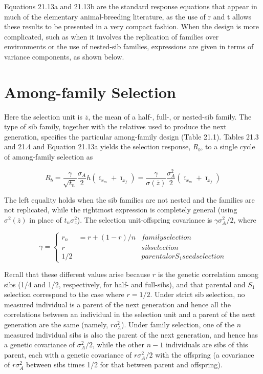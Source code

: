 \documentclass{article}
\begin{document}
Equations 21.13a and 21.13b are the standard response equations that appear in much of the elementary animal-breeding literature, as the use of r and t allows these results to be presented in a very compact fashion. When the design is more complicated, such as when it involves the replication of families over environments or the use of nested-sib families, expressions are given in terms of variance components, as shown below.

\section{Among-family Selection}
Here the selection unit is  $ \overline{z} $, the mean of a half-, full-, or nested-sib family. The type of sib family, together with the relatives used to produce the next generation, specifies the particular among-family design (Table 21.1). Tables 21.3 and 21.4 and Equation 21.13a yields the selection response,  $ R_{b} $, to a single cycle of among-family selection as

\begin{equation}
R_{b}=\frac{\gamma}{\sqrt{t_{n}}}\frac{\sigma_{A}}{2}h\left(\bar{\imath}_{x_{m}}+\bar{\imath}_{x_{f}}\right)=\frac{\gamma}{\sigma\left(\overline{z}\right)}\frac{\sigma_{A}^{2}}{2}\left(\bar{\imath}_{x_{m}}+\bar{\imath}_{x_{f}}\right)
\tag{21.14a}
\label{eq:21_14a}
\end{equation}

The left equality holds when the sib families are not nested and the families are not replicated, while the rightmost expression is completely general (using  $ \sigma^2(\overline{z}) $ in place of  $ t_n\sigma_z^2 $). The selection unit-offspring covariance is  $ \gamma\sigma_A^2/2 $, where

\begin{equation}
\gamma=\left\{\begin{aligned}r_{n}&=r+(1-r)/n&family selection\\ r&&sib selection\\ 1/2&&parental or S_{1}seed selection\end{aligned}\right.
\tag{21.14b}
\label{eq:21_14b}
\end{equation}

Recall that these different values arise because $r$ is the genetic correlation among sibs (1/4 and 1/2, respectively, for half- and full-sibs), and that parental and $S_1$ selection correspond to the case where $r = 1/2$. Under strict sib selection, no measured individual is a parent of the next generation and hence all the correlations between an individual in the selection unit and a parent of the next generation are the same (namely, $ro_A^2$). Under family selection, one of the $n$ measured individual sibs is also the parent of the next generation, and hence has a genetic covariance of $\sigma_A^2/2$, while the other $n - 1$ individuals are sibs of this parent, each with a genetic covariance of $r\sigma_A^2/2$ with the offspring (a covariance of $r\sigma_A^2$ between sibs times 1/2 for that between parent and offspring).
\end{document}
